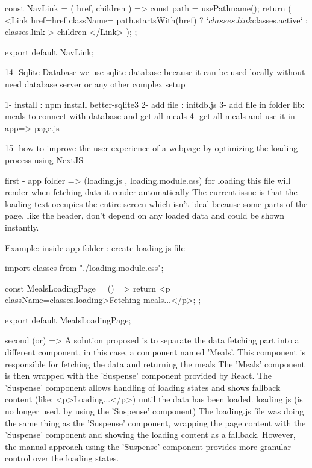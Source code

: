                         const NavLink = ({ href, children }) => {
                        const path = usePathname();
                        return (
                            <Link
                            href={href}
                            className={
                                path.startsWith(href)
                                ? `${classes.link} ${classes.active}`
                                : classes.link
                            }
                            >
                            {children}
                            </Link>
                        );
                        };

                        export default NavLink;


14- Sqlite Database
    we use sqlite database because it can be used locally without need database server or any other complex setup

    1- install : npm install better-sqlite3
    2- add file : initdb.js
    3- add file in folder lib: meals to connect with database and get all meals
    4- get all meals and use it in app=> page.js 


15-  how to improve the user experience of a webpage
     by optimizing the loading process using NextJS

        first    - app folder => (loading.js , loading.module.css) for loading 
                    this file will render when fetching data it render automatically
                    The current issue is that the loading text occupies the entire screen
                    which isn't ideal because some parts of the page,
                    like the header, don't depend on any loaded data and could be shown instantly.

                Example: 
                    inside app folder : create loading.js file 

                        import classes from "./loading.module.css";

                        const MealsLoadingPage = () => {
                        return <p className={classes.loading}>Fetching meals...</p>;
                        };

                        export default MealsLoadingPage;


      second  (or) => 
                    A solution proposed is to separate the data fetching part into a different component,
                    in this case, a component named 'Meals'.
                    This component is responsible for fetching the data and returning the meals 
                    The 'Meals' component is then wrapped with the 'Suspense' component provided by React.
                    The 'Suspense' component allows handling of loading states and shows fallback content (like: <p>Loading...</p>) until the data has been loaded.
                    loading.js (is no longer used. by using the 'Suspense' component)
                    The loading.js file was doing the same thing as the 'Suspense' component, wrapping the page content with the 'Suspense' component and showing the loading content as a fallback.
                    However, the manual approach using the 'Suspense' component provides more granular control over the loading states.

